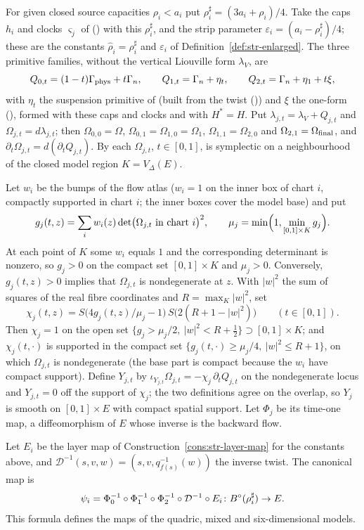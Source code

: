 For given closed source capacities $\rho_i<a_i$ put $\rho_i^\sharp=(3a_i+\rho_i)/4$. Take the caps $h_i$ and clocks
$\varsigma_j$ of () with this $\rho_i^\sharp$, and the strip parameter
$\varepsilon_i=(a_i-\rho_i^\sharp)/4$; these are the constants $\hat\rho_i=\rho_i^\sharp$ and $\varepsilon_i$ of
Definition~\ref{def:str-enlarged}. The three primitive families, without the vertical Liouville form $\lambda_V$, are
\[
 Q_{0,t}=(1-t)\Gamma_{\rm phys}+t\Gamma_n,\qquad
 Q_{1,t}=\Gamma_n+\eta_t,\qquad
 Q_{2,t}=\Gamma_n+\eta_1+t\xi ,
\]
with $\eta_t$ the suspension primitive of  (built from the twist ()) and $\xi$
the one-form (), formed with these caps and clocks and with $H^*=H$. Put
$\lambda_{j,t}=\lambda_V+Q_{j,t}$ and $\Omega_{j,t}=d\lambda_{j,t}$; then $\Omega_{0,0}=\Omega$, $\Omega_{0,1}=\Omega_{1,0}=\Omega_1$,
$\Omega_{1,1}=\Omega_{2,0}$ and $\Omega_{2,1}=\Omega_{\rm final}$, and $\partial_t\Omega_{j,t}=d(\partial_tQ_{j,t})$. By  each
$\Omega_{j,t}$, $t\in[0,1]$, is symplectic on a neighbourhood of the closed model region $K=V_\Delta(E)$.

Let $w_i$ be the bumps of the flow atlas ($w_i=1$ on the inner box of chart $i$, compactly supported in chart $i$; the inner boxes
cover the model base) and put
\[
 g_j(t,z)=\sum_iw_i(z)\det\bigl(\Omega_{j,t}\text{ in chart }i\bigr)^2,\qquad
 \mu_j=\min\Bigl(1,\min_{[0,1]\times K}g_j\Bigr).
\]
At each point of $K$ some $w_i$ equals $1$ and the corresponding determinant is nonzero, so $g_j>0$ on the compact set
$[0,1]\times K$ and $\mu_j>0$. Conversely, $g_j(t,z)>0$ implies that $\Omega_{j,t}$ is nondegenerate at $z$. With
$|w|^2$ the sum of squares of the real fibre coordinates and $R=\max_K|w|^2$, set
\[
 \chi_j(t,z)=S\bigl(4g_j(t,z)/\mu_j-1\bigr)\,S\bigl(2(R+1-|w|^2)\bigr)\qquad(t\in[0,1]).
\]
Then $\chi_j=1$ on the open set $\{g_j>\mu_j/2,\ |w|^2<R+\frac12\}\supset[0,1]\times K$; and $\chi_j(t,\cdot)$ is supported in the
compact set $\{g_j(t,\cdot)\ge\mu_j/4,\ |w|^2\le R+1\}$, on which $\Omega_{j,t}$ is nondegenerate (the base part is compact because
the $w_i$ have compact support). Define $Y_{j,t}$ by $\iota_{Y_{j,t}}\Omega_{j,t}=-\chi_j\,\partial_tQ_{j,t}$ on the nondegenerate locus
and $Y_{j,t}=0$ off the support of $\chi_j$; the two definitions agree on the overlap, so $Y_j$ is smooth on $[0,1]\times E$ with
compact spatial support. Let $\Phi_j$ be its time-one map, a diffeomorphism of $E$ whose inverse is the backward flow.

\begin{construction}\label{cons:native-packing}
Let $E_i$ be the layer map of Construction~\ref{cons:str-layer-map} for the constants above, and $\mathcal D^{-1}(s,v,w)=(s,v,q_{f(s)}^{-1}(w))$
the inverse twist. The canonical map is
\[
 \psi_i=\Phi_0^{-1}\circ\Phi_1^{-1}\circ\Phi_2^{-1}\circ\mathcal D^{-1}\circ E_i\colon B^{\circ}(\rho_i^\sharp)\to E .
\]
This formula defines the maps of the quadric, mixed and six-dimensional models.
\end{construction}

